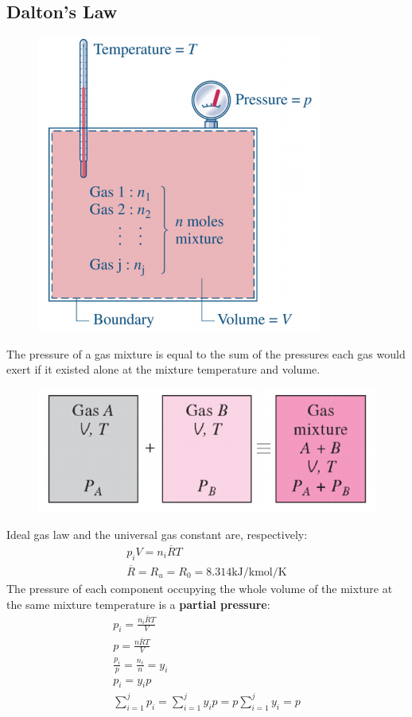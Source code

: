 \documentclass[class=report, crop=false, 12pt,a4paper]{standalone}
\begin{document}
\subsection{Dalton's Law}
\begin{figure}[H]
  \centering
  \includegraphics[width = 0.4 \textwidth]{../img/diagram93.png}
  \caption{}
\end{figure}
The pressure of a gas mixture is equal to the sum of the pressures each gas would exert if it existed alone at the mixture temperature and volume.
\begin{figure}[H]
  \centering
  \includegraphics[width = 0.7 \textwidth]{../img/diagram94.png}
  \caption{}
\end{figure}
Ideal gas law and the universal gas constant are, respectively:
\begin{gather}
  p_iV = n_i\overline{R}T \\[5pt]
  \overline{R} = R_u = R_0 = 8.314 \si{\kilo\joule\per\kilo\mole\per\kelvin}
\end{gather}
The pressure of each component occupying the whole volume of the mixture at the same mixture temperature is a \textbf{partial pressure}:
\begin{gather}
  p_i = \frac{n_i \overline{R} T}{V} \\[5pt]
  p = \frac{n \overline{R} T}{V} \\[5pt]
  \frac{p_i}{p} = \frac{n_i}{n} = y_i \\[5pt]
  p_i = y_ip \\[5pt]
  \sum_{i=1}^{j}p_i = \sum_{i=1}^{j}y_ip = p\sum_{i=1}^{j}y_i = p
\end{gather}
\end{document}
